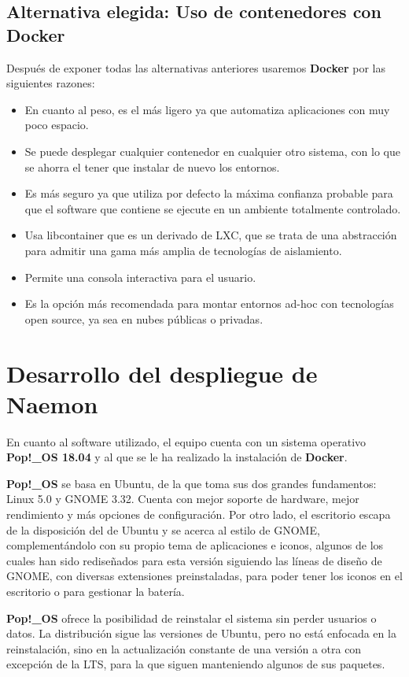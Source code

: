 \subsection{Alternativa elegida: Uso de contenedores con Docker}
Después de exponer todas las alternativas anteriores usaremos \textbf{Docker} por las siguientes razones:
\begin{itemize}
	\item En cuanto al peso, es el más ligero ya que automatiza aplicaciones con muy poco espacio.
	\item Se puede desplegar cualquier contenedor en cualquier otro sistema, con lo que se ahorra el tener que instalar de nuevo los entornos.
	\item Es más seguro ya que utiliza por defecto la máxima confianza probable para que el software que contiene se ejecute en un ambiente totalmente controlado.
	\item Usa libcontainer que es un derivado de LXC, que se trata de una abstracción para admitir una gama más amplia de tecnologías de aislamiento.
	\item Permite una consola interactiva para el usuario.
	\item Es la opción más recomendada para montar entornos ad-hoc con tecnologías open source, ya sea en nubes públicas o privadas.
	
\end{itemize}
\section{Desarrollo del despliegue de Naemon}
En cuanto al software utilizado, el equipo cuenta con un sistema operativo \textbf{Pop!\_OS 18.04} y al que se le ha realizado la instalación de \textbf{Docker}. 

\textbf{Pop!\_OS} se basa en Ubuntu, de la que toma sus dos grandes fundamentos: Linux 5.0 y GNOME 3.32. Cuenta con mejor soporte de hardware, mejor rendimiento y más opciones de configuración.
\newpage
Por otro lado, el escritorio escapa de la disposición del de Ubuntu y se acerca al estilo de GNOME, complementándolo con su propio tema de aplicaciones e iconos, algunos de los cuales han sido rediseñados para esta versión siguiendo las líneas de diseño de GNOME, con diversas extensiones preinstaladas, para poder tener los iconos en el escritorio o para gestionar la batería.

\textbf{Pop!\_OS} ofrece la posibilidad de reinstalar el sistema sin perder usuarios o datos. La distribución sigue las versiones de Ubuntu, pero no está enfocada en la reinstalación, sino en la actualización constante de una versión a otra con excepción de la LTS, para la que siguen manteniendo algunos de sus paquetes.

